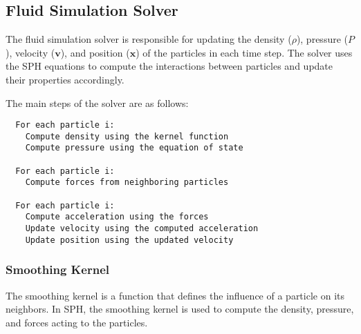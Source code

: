 \documentclass[a4paper]{article}
\begin{document}
\subsection{Fluid Simulation Solver}

The fluid simulation solver is responsible for updating the density ($\rho$), pressure ($P$), velocity ($\mathbf{v}$), and position ($\mathbf{x}$) of the particles in each time step.
The solver uses the SPH equations to compute the interactions between particles and update their properties accordingly.

The main steps of the solver are as follows:
\begin{verbatim}
  For each particle i:
    Compute density using the kernel function
    Compute pressure using the equation of state
  
  For each particle i:
    Compute forces from neighboring particles
  
  For each particle i:
    Compute acceleration using the forces
    Update velocity using the computed acceleration
    Update position using the updated velocity
\end{verbatim}

\subsubsection{Smoothing Kernel}

The smoothing kernel is a function that defines the influence of a particle on its neighbors.
In SPH, the smoothing kernel is used to compute the density, pressure, and forces acting to the particles.
\end{document}
